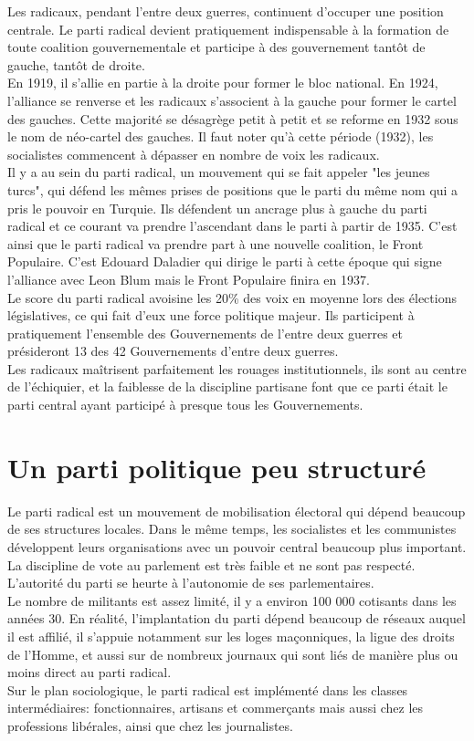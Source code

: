 \documentclass[10pt, a4paper, openany]{book}
\begin{document}
Les radicaux, pendant l'entre deux guerres, continuent d'occuper une position centrale. Le parti radical devient pratiquement indispensable à la formation de toute coalition gouvernementale et participe à des gouvernement tantôt de gauche, tantôt de droite. \\
En 1919, il s'allie en partie à la droite pour former le bloc national. En 1924, l'alliance se renverse et les radicaux s'associent à la gauche pour former le cartel des gauches. Cette majorité se désagrège petit à petit et se reforme en 1932 sous le nom de néo-cartel des gauches. Il faut noter qu'à cette période (1932), les socialistes commencent à dépasser en nombre de voix les radicaux. \\
Il y a au sein du parti radical, un mouvement qui se fait appeler "les jeunes turcs", qui défend les mêmes prises de positions que le parti du même nom qui a pris le pouvoir en Turquie. Ils défendent un ancrage plus à gauche du parti radical et ce courant va prendre l'ascendant dans le parti à partir de 1935. C'est ainsi que le parti radical va prendre part à une nouvelle coalition, le Front Populaire. C'est Edouard Daladier qui dirige le parti à cette époque qui signe l'alliance avec Leon Blum mais le Front Populaire finira en 1937. \\
Le score du parti radical avoisine les 20\% des voix en moyenne lors des élections législatives, ce qui fait d'eux une force politique majeur. Ils participent à pratiquement l'ensemble des Gouvernements de l'entre deux guerres et présideront 13 des 42 Gouvernements d'entre deux guerres. \\
Les radicaux maîtrisent parfaitement les rouages institutionnels, ils sont au centre de l'échiquier, et la faiblesse de la discipline partisane font que ce parti était le parti central ayant participé à presque tous les Gouvernements.

\section{Un parti politique peu structuré}

Le parti radical est un mouvement de mobilisation électoral qui dépend beaucoup de ses structures locales. Dans le même temps, les socialistes et les communistes développent leurs organisations avec un pouvoir central beaucoup plus important. La discipline de vote au parlement est très faible et ne sont pas respecté. L'autorité du parti se heurte à l'autonomie de ses parlementaires. \\
Le nombre de militants est assez limité, il y a environ 100 000 cotisants dans les années 30. En réalité, l'implantation du parti dépend beaucoup de réseaux auquel il est affilié, il s'appuie notamment sur les loges maçonniques, la ligue des droits de l'Homme, et aussi sur de nombreux journaux qui sont liés de manière plus ou moins direct au parti radical. \\
Sur le plan sociologique, le parti radical est implémenté dans les classes intermédiaires: fonctionnaires, artisans et commerçants mais aussi chez les professions libérales, ainsi que chez les journalistes. 
\end{document}
